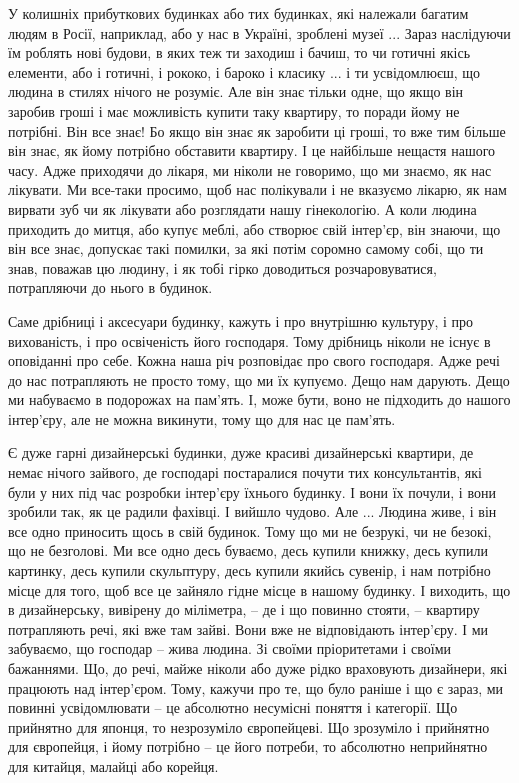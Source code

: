 У колишніх прибуткових будинках або тих будинках, які належали багатим людям в
Росії, наприклад, або у нас в Україні, зроблені музеї ... Зараз наслідуючи їм
роблять нові будови, в яких теж ти заходиш і бачиш, то чи готичні якісь
елементи, або і готичні, і рококо, і бароко і класику ... і ти усвідомлюєш, що
людина в стилях нічого не розуміє. Але він знає тільки одне, що якщо він
заробив гроші і має можливість купити таку квартиру, то поради йому не
потрібні. Він все знає! Бо якщо він знає як заробити ці гроші, то вже тим
більше він знає, як йому потрібно обставити квартиру. І це найбільше нещастя
нашого часу. Адже приходячи до лікаря, ми ніколи не говоримо, що ми знаємо, як
нас лікувати. Ми все-таки просимо, щоб нас полікували і не вказуємо лікарю, як
нам вирвати зуб чи як лікувати або розглядати нашу гінекологію. А коли людина
приходить до митця, або купує меблі, або створює свій інтер'єр, він знаючи, що
він все знає, допускає такі помилки, за які потім соромно самому собі, що ти
знав, поважав цю людину, і як тобі гірко доводиться розчаровуватися,
потрапляючи до нього в будинок.

Саме дрібниці і аксесуари будинку, кажуть і про внутрішню культуру, і про
вихованість, і про освіченість його господаря. Тому дрібниць ніколи не існує в
оповіданні про себе. Кожна наша річ розповідає про свого господаря. Адже речі
до нас потрапляють не просто тому, що ми їх купуємо. Дещо нам дарують. Дещо ми
набуваємо в подорожах на пам'ять. І, може бути, воно не підходить до нашого
інтер'єру, але не можна викинути, тому що для нас це пам'ять.

Є дуже гарні дизайнерські будинки, дуже красиві дизайнерські квартири, де немає
нічого зайвого, де господарі постаралися почути тих консультантів, які були у
них під час розробки інтер'єру їхнього будинку. І вони їх почули, і вони
зробили так, як це радили фахівці. І вийшло чудово. Але ... Людина живе, і він
все одно приносить щось в свій будинок. Тому що ми не безрукі, чи не безокі, що
не безголові. Ми все одно десь буваємо, десь купили книжку, десь купили
картинку, десь купили скульптуру, десь купили якийсь сувенір, і нам потрібно
місце для того, щоб все це зайняло гідне місце в нашому будинку. І виходить, що
в дизайнерську, вивірену до міліметра, – де і що повинно стояти, – квартиру
потрапляють речі, які вже там зайві. Вони вже не відповідають інтер'єру. І ми
забуваємо, що господар – жива людина. Зі своїми пріоритетами і своїми
бажаннями. Що, до речі, майже ніколи або дуже рідко враховують дизайнери, які
працюють над інтер'єром. Тому, кажучи про те, що було раніше і що є зараз, ми
повинні усвідомлювати – це абсолютно несумісні поняття і категорії. Що
прийнятно для японця, то незрозуміло європейцеві. Що зрозуміло і прийнятно для
європейця, і йому потрібно – це його потреби, то абсолютно неприйнятно для
китайця, малайці або корейця.

